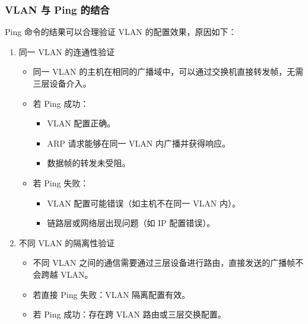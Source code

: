\documentclass[11pt]{article}
\begin{document}
\subsubsection{VLAN 与 Ping 的结合}
\label{sec:orgd191234}
Ping 命令的结果可以合理验证 VLAN 的配置效果，原因如下：
\begin{enumerate}
\item 同一 VLAN 的连通性验证
\begin{itemize}
\item 同一 VLAN 的主机在相同的广播域中，可以通过交换机直接转发帧，无需三层设备介入。
\item 若 Ping 成功：
\begin{itemize}
\item VLAN 配置正确。
\item ARP 请求能够在同一 VLAN 内广播并获得响应。
\item 数据帧的转发未受阻。
\end{itemize}
\item 若 Ping 失败：
\begin{itemize}
\item VLAN 配置可能错误（如主机不在同一 VLAN 内）。
\item 链路层或网络层出现问题（如 IP 配置错误）。
\end{itemize}
\end{itemize}
\item 不同 VLAN 的隔离性验证
\begin{itemize}
\item 不同 VLAN 之间的通信需要通过三层设备进行路由，直接发送的广播帧不会跨越 VLAN。
\item 若直接 Ping 失败：VLAN 隔离配置有效。
\item 若 Ping 成功：存在跨 VLAN 路由或三层交换配置。
\end{itemize}
\end{enumerate}
\end{document}
